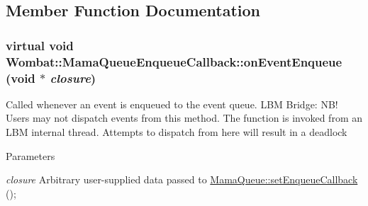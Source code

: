 \subsection{Member Function Documentation}
\hypertarget{classWombat_1_1MamaQueueEnqueueCallback_a7377a77ca8556b9621233ba5c729c0ba}{
\subsubsection[{onEventEnqueue}]{\setlength{\rightskip}{0pt plus 5cm}virtual void Wombat::MamaQueueEnqueueCallback::onEventEnqueue (void $\ast$ {\em closure})}}
\label{classWombat_1_1MamaQueueEnqueueCallback_a7377a77ca8556b9621233ba5c729c0ba}


Called whenever an event is enqueued to the event queue. LBM Bridge: NB! Users may not dispatch events from this method. The function is invoked from an LBM internal thread. Attempts to dispatch from here will result in a deadlock


\begin{DoxyParams}{Parameters}
\item[{\em closure}]Arbitrary user-\/supplied data passed to \hyperlink{classWombat_1_1MamaQueue_a852c925667c07e8bd0b3bc8cf30f4986}{MamaQueue::setEnqueueCallback} (); \end{DoxyParams}
